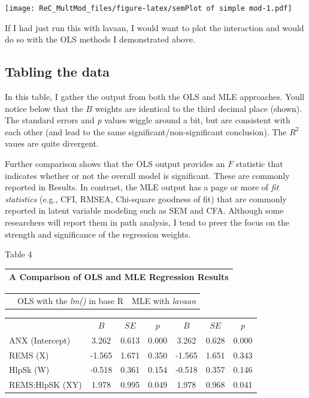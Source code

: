 \documentclass[
  english,
]{book}
\begin{document}
\texttt{[image: ReC\_MultMod\_files/figure-latex/semPlot of simple mod-1.pdf]}

If I had just run this with lavaan, I would want to plot the interaction and would do so with the OLS methods I demonstrated above.

\hypertarget{tabling-the-data-1}{%
\subsection{Tabling the data}\label{tabling-the-data-1}}

In this table, I gather the output from both the OLS and MLE approaches. Youll notice below that the \(B\) weights are identical to the third decimal place (shown). The standard errors and \emph{p} values wiggle around a bit, but are consistent with each other (and lead to the same significant/non-significant conclusion). The \(R^2\) vaues are quite divergent.

Further comparison shows that the OLS output provides an \(F\) statistic that indicates whether or not the overall model is significant. These are commonly reported in Results. In contrast, the MLE output has a page or more of \emph{fit statistics} (e.g., CFI, RMSEA, Chi-square goodness of fit) that are commonly reported in latent variable modeling such as SEM and CFA. Although some researchers will report them in path analysis, I tend to preer the focus on the strength and significance of the regression weights.

Table 4

\begin{longtable}[]{@{}l@{}}
\toprule
A Comparison of OLS and MLE Regression Results \\
\midrule
\endhead
\bottomrule
\end{longtable}

\begin{longtable}[]{@{}ccc@{}}
\toprule
& & \\
\midrule
\endhead
& OLS with the \emph{lm()} in base R & MLE with \emph{lavaan} \\
\bottomrule
\end{longtable}

\begin{longtable}[]{@{}lcccccc@{}}
\toprule
& & & & & & \\
\midrule
\endhead
& \(B\) & \(SE\) & \(p\) & \(B\) & \(SE\) & \(p\) \\
ANX (Intercept) & 3.262 & 0.613 & 0.000 & 3.262 & 0.628 & 0.000 \\
REMS (X) & -1.565 & 1.671 & 0.350 & -1.565 & 1.651 & 0.343 \\
HlpSk (W) & -0.518 & 0.361 & 0.154 & -0.518 & 0.357 & 0.146 \\
REMS:HlpSK (XY) & 1.978 & 0.995 & 0.049 & 1.978 & 0.968 & 0.041 \\
\bottomrule
\end{longtable}
\end{document}
